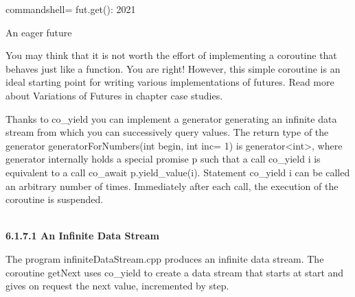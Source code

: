 \begin{tcblisting}{commandshell={}}
fut.get(): 2021
\end{tcblisting}

\begin{center}
An eager future
\end{center}

You may think that it is not worth the effort of implementing a coroutine that behaves just like a function. You are right! However, this simple coroutine is an ideal starting point for writing various implementations of futures. Read more about Variations of Futures in chapter case studies.


Thanks to co\_yield you can implement a generator generating an infinite data stream from which you can successively query values. The return type of the generator generatorForNumbers(int begin, int inc= 1) is generator<int>, where generator internally holds a special promise p such that a call co\_yield i is equivalent to a call co\_await p.yield\_value(i). Statement co\_yield i can be called an arbitrary number of times. Immediately after each call, the execution of the coroutine is suspended.

\hspace*{\fill} \\ %
\noindent
\textbf{6.1.7.1\hspace{0.2cm} An Infinite Data Stream}

The program infiniteDataStream.cpp produces an infinite data stream. The coroutine getNext uses co\_yield to create a data stream that starts at start and gives on request the next value, incremented by step.

